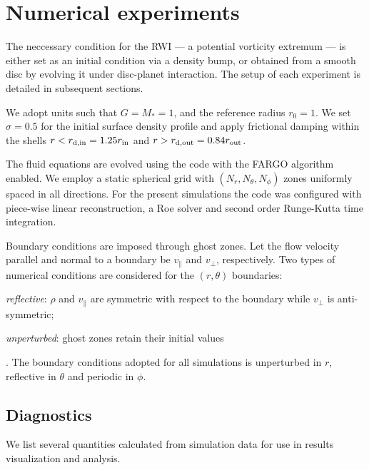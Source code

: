 \section{Numerical experiments}\label{sims}
The neccessary condition for the RWI --- a potential vorticity 
extremum \citep{li00} --- is either set as an initial condition
via a density bump, or obtained from a smooth disc by evolving it
under disc-planet interaction. The setup of each experiment is
detailed in subsequent sections.    

We adopt units such that $G=M_*=1$, and the reference radius $r_0=1$.    
We set $\sigma=0.5$ for the initial surface density profile and apply 
frictional damping within the shells $r<r_\mathrm{d,in} = 1.25r_\mathrm{in}$
and $r>r_\mathrm{d,out}=0.84r_\mathrm{out}$.

The fluid equations are evolved using the \pluto code \citep{mignone07} with 
the FARGO algorithm enabled\citep{mignone12}. We employ a static
spherical grid with $(N_r, N_\theta, N_\phi)$ zones uniformly spaced
in all directions. For the present simulations the code was configured
with piece-wise linear reconstruction, a Roe solver and second order
Runge-Kutta time integration.   

Boundary conditions are imposed through ghost zones.   
Let the flow velocity parallel and normal to a boundary be
$v_\parallel$ and $v_\perp$, respectively. Two types of numerical 
conditions are considered for the $(r,\theta)$ boundaries:
\begin{inparaenum}[(a)]
\item \emph{reflective}: $\rho$ and $v_\parallel$ are symmetric with
  respect to the boundary while $v_\perp$ is anti-symmetric;  
\item \emph{unperturbed}: ghost zones retain their initial values
\end{inparaenum}. 
The boundary conditions adopted for all simulations is unperturbed in
$r$, reflective in $\theta$ and periodic in $\phi$. 


\subsection{Diagnostics}
We list several quantities calculated from simulation data for use in
results visualization and analysis.  

